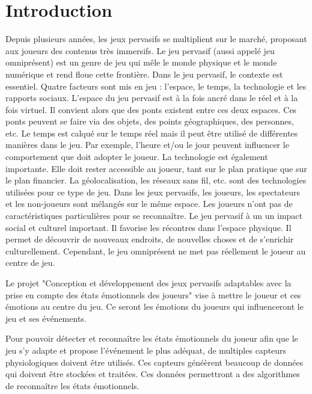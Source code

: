 \documentclass{article}
\begin{document}
\section{Introduction}
	Depuis plusieurs années, les jeux pervasifs se multiplient sur le marché, proposant aux joueurs des contenus très immersifs.
	Le jeu pervasif (aussi appelé jeu omniprésent) est un genre de jeu qui mêle le monde physique et le monde numérique et rend floue cette frontière.
	Dans le jeu pervasif, le contexte est essentiel. 
	Quatre facteurs sont mis en jeu : l'espace, le temps, la technologie et les rapports sociaux. 
	L'espace du jeu pervasif est à la fois ancré dans le réel et à la fois virtuel.
	Il convient alors que des ponts existent entre ces deux espaces. 
	Ces ponts peuvent se faire via des objets, des points géographiques, des personnes, etc. 
	Le temps est calqué sur le temps réel mais il peut être utilisé de différentes manières dans le jeu. 
	Par exemple, l'heure et/ou le jour peuvent influencer le comportement que doit adopter le joueur.
	La technologie est également importante. 
	Elle doit rester accessible au joueur, tant sur le plan pratique que sur le plan financier. 
	La géolocalisation, les réseaux sans fil, etc. sont des technologies utilisées pour ce type de jeu.
	Dans les jeux pervasifs, les joueurs, les spectateurs et les non-joueurs sont mélangés sur le même espace. 
	Les joueurs n'ont pas de caractéristiques particulières pour se reconnaître.%
	Le jeu pervasif à un un impact social et culturel important.
	Il favorise les récontres dans l'espace physique.
	Il permet de découvrir de nouveaux endroits, de nouvelles choses et de s'enrichir culturellement.
	Cependant, le jeu omniprésent ne met pas réellement le joueur au centre de jeu.\par
	Le projet "Conception et développement des jeux pervasifs adaptables avec la prise en compte des états émotionnels des joueurs" vise à mettre le joueur et ces émotions au centre du jeu.
	Ce seront les émotions du joueurs qui influenceront le jeu et ses événements.\par
	Pour pouvoir détecter et reconnaître les états émotionnels du joueur afin que le jeu s'y adapte et propose l'événement le plus adéquat, de multiples capteurs physiologiques doivent être utilisés.
	Ces capteurs généèrent beaucoup de données qui doivent être stockées et traitées.
	Ces données permettront a des algorithmes de reconnaître les états émotionnels.\par
\end{document}
